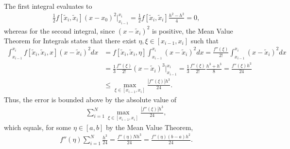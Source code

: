 \documentclass[a4paper,12pt]{article}
\DeclareMathOperator*{\argmax}{\arg\!\max}
\begin{document}
\begin{enumerate}
        The first integral evaluates to
        \begin{align*}
            \frac{1}{2} f[\tilde{x}_i, \tilde{x}_i] (x - x_0)^2 \bigg|_{x_{i - 1}}^{x_i}
            = \frac{1}{2} f[\tilde{x}_i, \tilde{x}_i] \frac{h^2 - h^2}{4} = 0,
        \end{align*}
        whereas for the second integral, since $(x - \tilde{x}_i)^2$ is positive, the Mean Value Theorem for Integrals states that there exist $\eta, \xi \in [x_{i - 1}, x_i]$ such that
        \begin{align*}
            \int_{x_{i - 1}}^{x_i} f[\tilde{x}_i, \tilde{x}_i, x](x - \tilde{x}_i)^2 dx
            &= f[\tilde{x}_i, \tilde{x}_i, \eta] \int_{x_{i - 1}}^{x_i} (x - \tilde{x}_i)^2 dx
            = \frac{f''(\xi)}{2!} \int_{x_{i - 1}}^{x_i} (x - \tilde{x}_i)^2 dx \\
            &= \frac{1}{3} \frac{f''(\xi)}{2!} (x - \tilde{x}_i)^3 \bigg|_{x_{i - 1}}^{x_i}
            = \frac{1}{3} \frac{f''(\xi)}{2!} \frac{h^3 + h^3}{8} = \frac{f''(\xi) h^3}{24} \\
            &\leq \max_{\xi \in [x_{i - 1}, x_i]} \frac{|f''(\xi)| h^3}{24}.
        \end{align*}
        Thus, %
        the error is bounded above by the absolute value of
        \begin{align*}
            \sum_{i = 1}^N \max_{\xi \in [x_{i - 1}, x_i]} \frac{|f''(\xi)| h^3}{24},
        \end{align*}
        which equals, for some $\eta \in [a, b]$ by the Mean Value Theorem,
        \begin{align*}
            f''(\eta) \sum_{i = 1}^N \frac{h^3}{24}
            = \frac{f''(\eta) Nh^3}{24}
            = \frac{f''(\eta) (b - a)h^2}{24}.
        \end{align*}


\end{enumerate}
\end{document}

